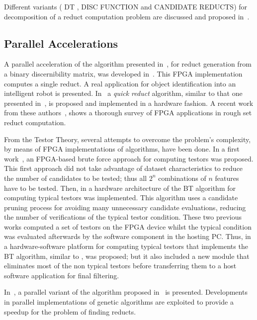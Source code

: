 \documentclass[authoryear,11pt]{elsarticle}
\makeatletter
\newcommand{\setword}[2]{%
  \phantomsection
  #1\def\@currentlabel{\unexpanded{#1}}\label{#2}%
}
\makeatother
\begin{document}
  Different variants (\setword{DT}{DT}, DISC FUNCTION and CANDIDATE REDUCTS) for decomposition of a reduct 
  computation problem are discussed and proposed in~\citep{Strakowski08}.

\subsection{Parallel Accelerations}

  A parallel acceleration of the algorithm presented in~\citep{Yang08}, for reduct generation from a binary
  discernibility matrix, was developed in~\citep{Tiwari11,Tiwari12}. This FPGA implementation computes a 
  single reduct. A real application for object identification into an intelligent robot is presented.
  In~\citep{Tiwari13} a \emph{quick reduct} algorithm, similar to that one presented in~\citep{Chouchoulas01}, 
  is proposed and implemented in a hardware fashion. A recent work from these authors~\citep{Tiwari14}, 
  shows a thorough survey of FPGA applications in rough set reduct computation.

  From the Testor Theory, several attempts to overcome the problem's complexity, by means of FPGA
  implementations of algorithms, have been done. In a first work~\citep{Cumplido06}, an 
  FPGA-based brute force approach for computing testors was proposed. This first approach did 
  not take advantage of dataset characteristics to reduce the number of candidates to be tested; 
  thus all $2^n$ combinations of $n$ features have to be tested. Then, in \citep{Rojas07} a hardware 
  architecture of the BT algorithm for computing typical testors was implemented. 
  This algorithm uses a candidate pruning process for avoiding many unnecessary candidate evaluations, 
  reducing the number of verifications of the typical testor condition. These two previous works computed 
  a set of testors on the FPGA device whilst the typical condition was evaluated afterwards by the 
  software component in the hosting PC. Thus, in~\citep{Rojas12} a hardware-software platform for 
  computing typical testors that implements the BT algorithm, similar to \citep{Rojas07}, was proposed; 
  but it also included a new module that eliminates most of the non typical testors before transferring them to 
  a host software application for final filtering. 
	
  In~\citep{Wroblewski98}, a parallel variant of the algorithm proposed in~\citep{Wroblewski95} is presented.
  Developments in parallel implementations of genetic algorithms are exploited to provide a speedup for the 
  problem of finding reducts.
  
\end{document}
